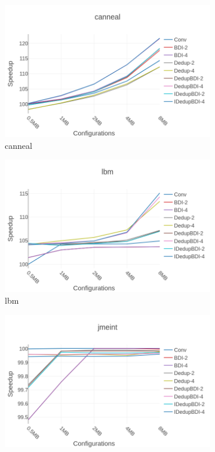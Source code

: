 \begin{figure}
    \begin{subfigure}{0.5\textwidth}
        \includegraphics[width=\textwidth]{canneal-speedup.png}
        \caption{canneal}
    \end{subfigure}
    \begin{subfigure}{0.5\textwidth}
        \includegraphics[width=\textwidth]{lbm-speedup.png}
        \caption{lbm}
    \end{subfigure}
    \begin{subfigure}{0.5\textwidth}
        \includegraphics[width=\textwidth]{jmeint-speedup.png}

\end{subfigure}
\end{figure}
